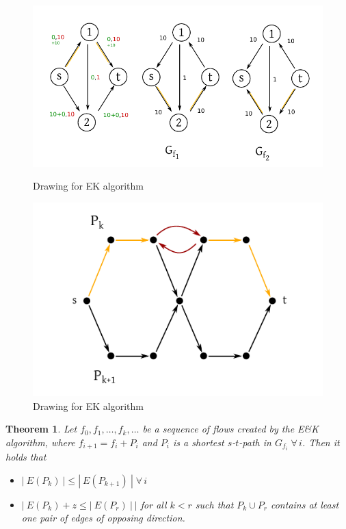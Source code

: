 \documentclass{article}
\newtheorem{theorem}{Theorem}
\newcommand{\card}[1]{\left|\:\!#1\:\!\right|}
\newcommand{\gath}[2]{$#1$-$#2$-path} %
\newcommand{\fall}{\;\forall\,}
\begin{document}
\begin{figure}[!ht]
 \begin{center}
  \includegraphics{img/ek_algorithm1.pdf}
  \caption{Drawing for EK algorithm}
 \end{center}
 \begin{center}
  \includegraphics{img/ek_algorithm.pdf}
  \caption{Drawing for EK algorithm}
 \end{center}
\end{figure}

\begin{theorem}\label{lemma-4.6}
  Let $f_0, f_1, \ldots, f_k, \ldots$ be a sequence of flows created by the E\&K algorithm, where $f_{i+1} = f_i + P_i$ and $P_i$ is a shortest \gath st in $G_{f_i} \fall i$. Then it holds that
  \begin{itemize}
    \item $\card{E(P_k)} \leq \card{E(P_{k+1})} \fall i$
    \item $\card{E(P_k) + z \leq \card{E(P_r)}}$ for all $k < r$ such that $P_k \cup P_r$ contains at least one pair of edges of opposing direction.
  \end{itemize}
\end{theorem}
\end{document}
